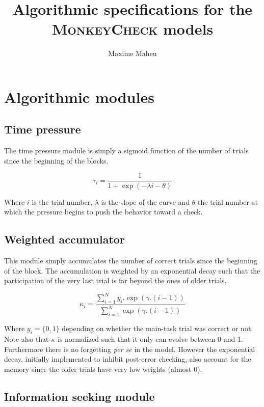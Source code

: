 \documentclass{article}
\title{Algorithmic specifications for the \textsc{MonkeyCheck} models}
\author{Maxime Maheu}
\begin{document}
\maketitle

\section{Algorithmic modules}

\subsection{Time pressure}

The time pressure module is simply a sigmoid function of the number of trials 
since the beginning of the blocks.

\begin{equation}
  \tau_{i} = \frac{1}{1 + \exp(-\lambda i - \theta)}
\end{equation}

Where $i$ is the trial number, $\lambda$ is the slope of the curve and $\theta$ the trial number at which the 
pressure begins to push the behavior toward a check.

\subsection{Weighted accumulator}

This module simply accumulates the number of correct trials since the beginning 
of the block. The accumulation is weighted by an exponential decay such that the 
participation of the very last trial is far beyond the ones of older trials.

\begin{equation}
  \kappa_{i} = \frac{\sum_{i=1}^{N} y_{i} . \exp(\gamma . (i-1))}{\sum_{i=1}^{N} \exp(\gamma . (i-1))}
\end{equation}

Where $y_{i}=\{0,1\}$ depending on whether the main-task trial was correct or not. Note also that $\kappa$ is normalized such that it only can evolve between 0 and 1. 
Furthermore there is no forgetting \textit{per se} in the model. However the exponential decay, initially implemented to inhibit post-error checking, also account for 
the memory since the older trials have very low weights (almost 0).

\subsection{Information seeking module}
\end{document}
